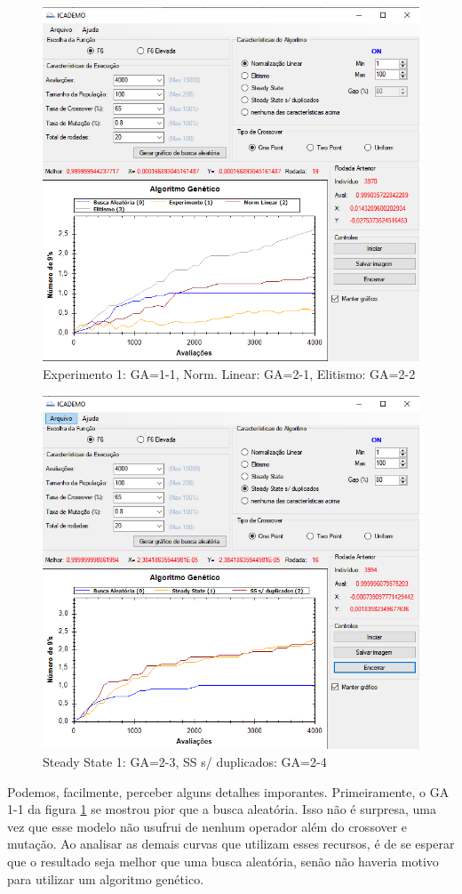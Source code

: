 \documentclass[12pt]{article}
\begin{document}
\begin{figure}[H]
	\centering
	\includegraphics[width=0.7\linewidth]{Imagens/questao1_1}
	\caption{Experimento 1: GA=1-1, Norm. Linear: GA=2-1, Elitismo: GA=2-2}
	\label{fig:questao11}
\end{figure}

\begin{figure}[H]
	\centering
	\includegraphics[width=0.7\linewidth]{Imagens/questao1_2}
	\caption{Steady State 1: GA=2-3, SS s/ duplicados: GA=2-4}
	\label{fig:questao12}
\end{figure}

Podemos, facilmente, perceber alguns detalhes imporantes. Primeiramente, o GA 1-1 da figura \ref{fig:questao11} se mostrou pior que a busca aleatória. Isso não é surpresa,  uma vez que esse modelo não usufrui de nenhum operador além do crossover e mutação. Ao analisar as demais curvas que utilizam esses recursos, é de se esperar que o resultado seja melhor que uma busca aleatória, senão não haveria motivo para utilizar um algoritmo genético.
\end{document}
